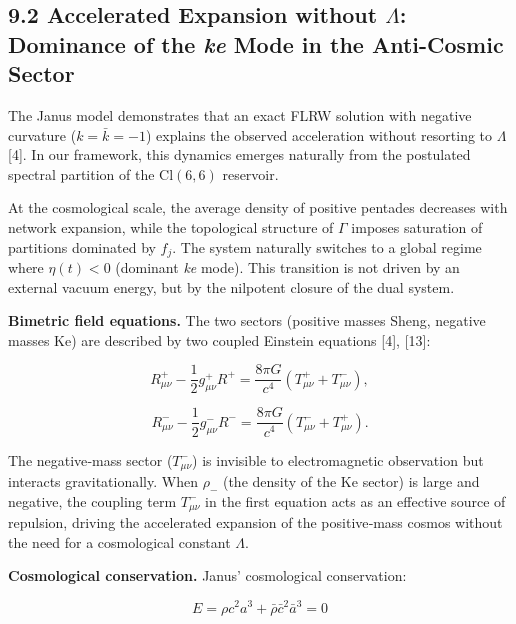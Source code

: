 \documentclass[11pt]{article}
\begin{document}
\hypertarget{accelerated-expansion-without-lambda-dominance-of-the-mode-in-the-anti-cosmic-sector}{%
\subsection{\texorpdfstring{9.2 Accelerated Expansion without
\(\Lambda\): Dominance of the \textit{ke} Mode in the Anti-Cosmic
Sector}{9.2 Accelerated Expansion without \textbackslash Lambda: Dominance of the  Mode in the Anti-Cosmic Sector}}\label{accelerated-expansion-without-lambda-dominance-of-the-mode-in-the-anti-cosmic-sector}}

The Janus model demonstrates that an exact FLRW solution with negative
curvature (\(k=\bar{k}=-1\)) explains the observed acceleration without
resorting to \(\Lambda\) {[}4{]}. In our framework, this dynamics
emerges naturally from the postulated spectral partition of the
\(\text{Cl}(6,6)\) reservoir.

At the cosmological scale, the average density of positive pentades
decreases with network expansion, while the topological structure of
\(\Gamma\) imposes saturation of partitions dominated by \(f_j\). The
system naturally switches to a global regime where \(\eta(t) < 0\)
(dominant \textit{ke} mode). This transition is not driven by an
external vacuum energy, but by the nilpotent closure of the dual system.

\textbf{Bimetric field equations.} The two sectors (positive masses
Sheng, negative masses Ke) are described by two coupled Einstein
equations {[}4{]}, {[}13{]}:

\[
R_{\mu\nu}^+ - \frac12 g_{\mu\nu}^+ R^+ = \frac{8\pi G}{c^4} \left( T_{\mu\nu}^+ + T_{\mu\nu}^- \right),
\]

\[
R_{\mu\nu}^- - \frac12 g_{\mu\nu}^- R^- = \frac{8\pi G}{c^4} \left( T_{\mu\nu}^- + T_{\mu\nu}^+ \right).
\]

The negative‑mass sector (\(T_{\mu\nu}^-\)) is invisible to
electromagnetic observation but interacts gravitationally. When
\(\rho_-\) (the density of the Ke sector) is large and negative, the
coupling term \(T_{\mu\nu}^-\) in the first equation acts as an
effective source of repulsion, driving the accelerated expansion of the
positive‑mass cosmos without the need for a cosmological constant
\(\Lambda\).

\textbf{Cosmological conservation.} Janus' cosmological conservation:

\[
E = \rho c^2 a^3 + \bar{\rho} \bar{c}^2 \bar{a}^3 = 0
\]
\end{document}
